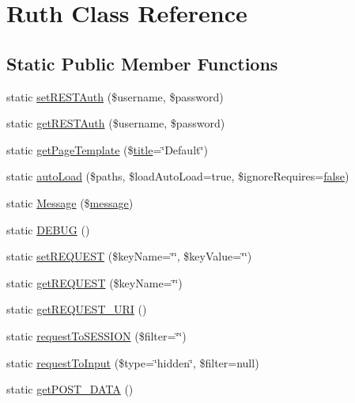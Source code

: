 \hypertarget{classRuth}{}\section{Ruth Class Reference}
\label{classRuth}
\subsection*{Static Public Member Functions}
\begin{DoxyCompactItemize}
\item 
static \hyperlink{classRuth_ad43f0c266cd72d1f3d26442528570d38}{set\+R\+E\+S\+T\+Auth} (\$username, \$password)
\item 
static \hyperlink{classRuth_ac185be50454d3107da9eb3fe45503b48}{get\+R\+E\+S\+T\+Auth} (\$username, \$password)
\item 
static \hyperlink{classRuth_ac470a420ccefd668c3a50bead17e2d8a}{get\+Page\+Template} (\$\hyperlink{Shape_8php_ad264ad0cabbe965bf7f7c8a5ed6abebb}{title}=\char`\"{}Default\char`\"{})
\item 
static \hyperlink{classRuth_a0d04b422b261fcbf033abfe6b77d5a2d}{auto\+Load} (\$paths, \$load\+Auto\+Load=true, \$ignore\+Requires=\hyperlink{tina4_8php_aec2deb5590a84bee262c3bea206ae88f}{false})
\item 
static \hyperlink{classRuth_a6322471f9832f6b0c92e8d321956874c}{Message} (\$\hyperlink{Tessa_8php_a37ab31c170417027f819bfc053d7cd39}{message})
\item 
static \hyperlink{classRuth_aa0e8f0a163756675b0ec431bb7dd0b49}{D\+E\+B\+U\+G} ()
\item 
static \hyperlink{classRuth_a0fc75ae6b986d7109f66f659cf1dcac2}{set\+R\+E\+Q\+U\+E\+S\+T} (\$key\+Name=\char`\"{}\char`\"{}, \$key\+Value=\char`\"{}\char`\"{})
\item 
static \hyperlink{classRuth_abe809de9dafced3724124f3399af01f3}{get\+R\+E\+Q\+U\+E\+S\+T} (\$key\+Name=\char`\"{}\char`\"{})
\item 
static \hyperlink{classRuth_a0a05421198533990654d0c1fb0beaffd}{get\+R\+E\+Q\+U\+E\+S\+T\+\_\+\+U\+R\+I} ()
\item 
static \hyperlink{classRuth_a627fd70f5f186ba0d4d3dc187a432b81}{request\+To\+S\+E\+S\+S\+I\+O\+N} (\$filter=\char`\"{}\char`\"{})
\item 
static \hyperlink{classRuth_ae10d9c25d1910e59a15662dd1304c23b}{request\+To\+Input} (\$type=\char`\"{}hidden\char`\"{}, \$filter=null)
\item 
static \hyperlink{classRuth_addbd05bd71b3abeff8e8250c46897e5b}{get\+P\+O\+S\+T\+\_\+\+D\+A\+T\+A} ()

\end{DoxyCompactItemize}
